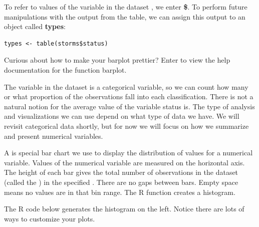 \ee
\ee

\bbox
\bi
\ii To refer to values of the  variable \textbf{} in the dataset  \textbf{} , we enter \textbf{\$}.
\ii To perform future manipulations with the output from the table, we can assign this output  to an object called \textbf{types}: 
\begin{lstlisting}
types <- table(storms$status)
\end{lstlisting}
\ii Curious about how to make your barplot prettier? Enter \textbf{} to view the help documentation for the function barplot.
\ei
\ebox

The variable \textbf{} in the dataset  \textbf{}  is a categorical variable, so we can count how many or what proportion of the observations fall into each classification. There is not a natural notion for the average value of the variable status is. The type of analysis and visualizations we can use depend on what type of data we have. We will revisit categorical data shortly, but for now we will focus on how we summarize and present numerical variables.

\clearpage


\bbox
A \textbf{} is special bar chart we use to display the distribution of values for a numerical variable.
\bi
\ii Values of the numerical variable are measured on the horizontal axis.
\ii The height of each bar gives the total number of observations in the dataset (called the \textbf{}) in the specified \textbf{}. 
\ii There are no gaps between bars. Empty space means no values are in that bin range.
\ii The R function \textbf{} creates a histogram.
\ei
\ebox

 The R code below generates the histogram on the left. Notice there are lots of ways to customize your plots.

